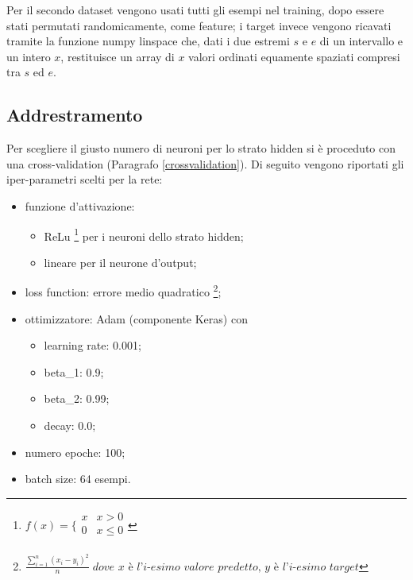 \documentclass[12pt]{report}
\begin{document}
Per il secondo dataset vengono usati tutti gli esempi nel training, dopo essere stati permutati randomicamente, come feature; i target invece vengono ricavati tramite la funzione numpy linspace che, dati i due estremi $s$ e $e$ di un intervallo e un intero $x$, restituisce un array di $x$ valori ordinati equamente spaziati compresi tra $s$ ed $e$.

\subsection{Addrestramento}
Per scegliere il giusto numero di neuroni per lo strato hidden si è proceduto con una cross-validation (Paragrafo \ref{crossvalidation}). Di seguito vengono riportati gli iper-parametri scelti per la rete:
\begin{itemize}
\item{funzione d’attivazione}:

\begin{itemize}
\item{ReLu 
\footnote{$f(x) =
\bigg \{
\begin{array}{rl}
x & x > 0 \\
0 & x \leq 0 \\
\end{array}
$
} per i neuroni dello strato hidden};
\item{lineare per il neurone d'output};
\end{itemize}

\item{loss function}: errore medio quadratico \footnote{
$\displaystyle{\frac{\sum_{i=1}^n \left(x_i - y_i\right)^2}{n}} \; \textit{dove x è l'i-esimo valore predetto, y è l'i-esimo target}$
};

\item{ottimizzatore}: Adam (componente Keras) con

\begin{itemize}
\item{learning rate}: 0.001;
\item{beta\_1}: 0.9;
\item{beta\_2}: 0.99;
\item{decay}: 0.0;
\end{itemize}

\item{numero epoche}: 100;

\item{batch size}: 64 esempi.
\end{itemize}
\end{document}
